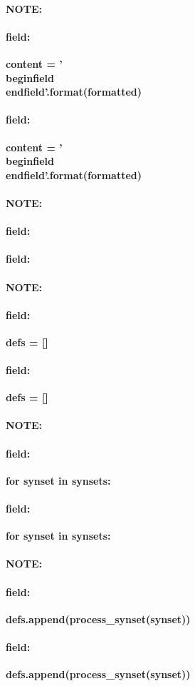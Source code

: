 \documentclass[12pt]{article}
\newenvironment{note}{\paragraph{NOTE:}}{}
\newenvironment{field}{\paragraph{field:}}{}
\begin{document}
\begin{note}
\begin{field}
\textbf{\large content = '\\begin{{field}}\n{}\n\\end{{field}}\n'.format(formatted)}
\end{field}
\begin{field}
\textbf{\large content = '\\begin{{field}}\n{}\n\\end{{field}}\n'.format(formatted)}
\begin{description}

\end{description}
\end{field}
\end{note}
\begin{note}
\begin{field}
\textbf{\large }
\end{field}
\begin{field}
\textbf{\large }
\begin{description}

\end{description}
\end{field}
\end{note}
\begin{note}
\begin{field}
\textbf{\large defs = []}
\end{field}
\begin{field}
\textbf{\large defs = []}
\begin{description}

\end{description}
\end{field}
\end{note}
\begin{note}
\begin{field}
\textbf{\large for synset in synsets:}
\end{field}
\begin{field}
\textbf{\large for synset in synsets:}
\begin{description}

\end{description}
\end{field}
\end{note}
\begin{note}
\begin{field}
\textbf{\large defs.append(process_synset(synset))}
\end{field}
\begin{field}
\textbf{\large defs.append(process_synset(synset))}
\begin{description}

\end{description}
\end{field}
\end{note}
\end{document}
